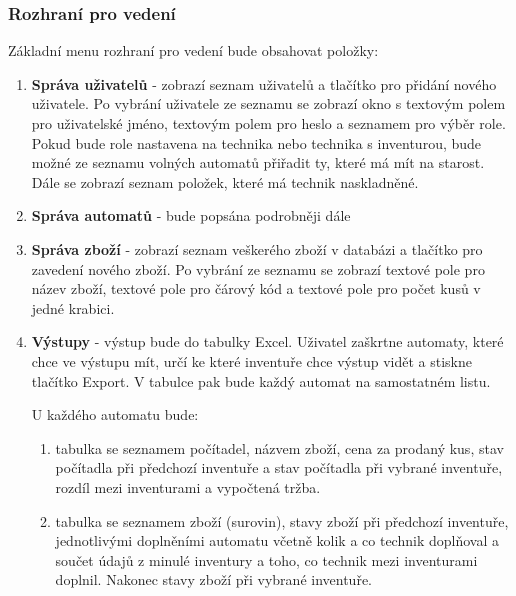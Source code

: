 \documentclass[a4paper,10pt]{article}
\begin{document}
\subsubsection{Rozhraní pro vedení}
Základní menu rozhraní pro vedení bude obsahovat položky:
\begin{enumerate}
	\item \textbf{Správa uživatelů} - zobrazí seznam uživatelů a tlačítko pro přidání nového uživatele. Po vybrání uživatele ze seznamu se zobrazí okno s textovým polem pro uživatelské jméno, textovým polem pro heslo a seznamem pro výběr role. Pokud bude role nastavena na technika nebo technika s inventurou, bude možné ze seznamu volných automatů přiřadit ty, které má mít na starost. Dále se zobrazí seznam položek, které má technik naskladněné.
	\item \textbf{Správa automatů} - bude popsána podrobněji dále
	\item \textbf{Správa zboží} - zobrazí seznam veškerého zboží v databázi a tlačítko pro zavedení nového zboží. Po vybrání ze seznamu se zobrazí textové pole pro název zboží, textové pole pro čárový kód a textové pole pro počet kusů v jedné krabici.
	\item \textbf{Výstupy} - výstup bude do tabulky Excel. Uživatel zaškrtne automaty, které chce ve výstupu mít, určí ke které inventuře chce výstup vidět a stiskne tlačítko Export. V tabulce pak bude každý automat na samostatném listu. 
	
	U každého automatu bude:
	\begin{enumerate}
		\item tabulka se seznamem počítadel, názvem zboží, cena za prodaný kus, stav počítadla při předchozí inventuře a stav počítadla při vybrané inventuře, rozdíl mezi inventurami a vypočtená tržba.
		\item tabulka se seznamem zboží (surovin), stavy zboží při předchozí inventuře, jednotlivými doplněními automatu včetně kolik a co technik doplňoval a součet údajů z minulé inventury a toho, co technik mezi inventurami doplnil. Nakonec stavy zboží při vybrané inventuře.
	\end{enumerate}
\end{enumerate}
\end{document}
